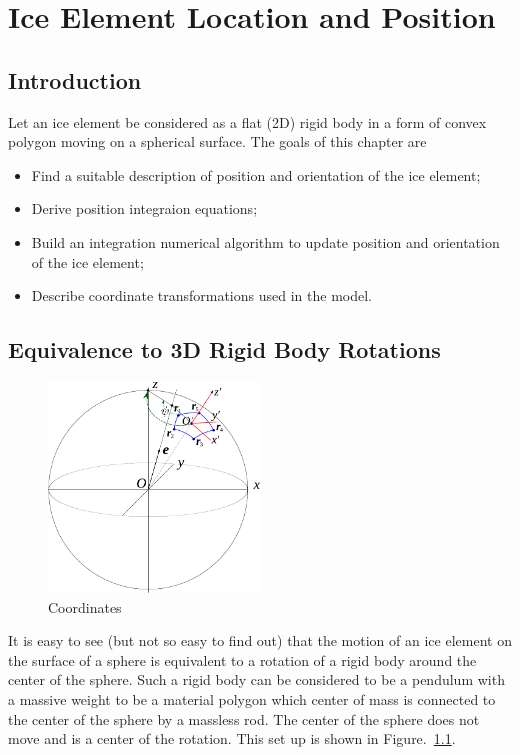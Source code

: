 
\chapter{Ice Element Location and Position}

\section{Introduction}

Let an ice element be considered as a flat (2D) rigid body in a form
of convex polygon moving on a spherical surface. The goals of this
chapter are
\begin{itemize}
  \item Find a suitable description of position and orientation of the
    ice element;
  \item Derive position integraion equations;
  \item Build an integration numerical algorithm to update position
    and orientation of the ice element;
  \item Describe coordinate transformations used in the model.
\end{itemize}

\section{Equivalence to 3D Rigid Body Rotations}

\begin{figure}
  \center
  \includegraphics[width=0.5\textwidth]{pics/sphere-dynamics.pdf}
  \caption{Coordinates}
  \label{fig:coordinates}
\end{figure}

It is easy to see (but not so easy to find out) that the motion of an
ice element on the surface of a sphere is equivalent to a rotation of
a rigid body around the center of the sphere. Such a rigid body can be
considered to be a pendulum with a massive weight to be a material
polygon which center of mass is connected to the center of the sphere
by a massless rod. The center of the sphere does not move and is a
center of the rotation. This set up is shown in
Figure.~\ref{fig:coordinates}.

